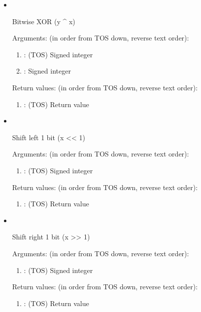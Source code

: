 \begin{itemize}
\noindent Return values: (in order from TOS down, reverse text order):
\begin{enumerate}
\item {}: (TOS) Return value
\end{enumerate}

\item \forthinlinehl{^}\ 

\noindent Bitwise XOR (y {\textasciicircum} x)

\noindent Arguments: (in order from TOS down, reverse text order):
\begin{enumerate}
\item {}: (TOS) Signed integer
\item {}: Signed integer
\end{enumerate}

\noindent Return values: (in order from TOS down, reverse text order):
\begin{enumerate}
\item {}: (TOS) Return value
\end{enumerate}

\item {}\ 

\noindent Shift left 1 bit (x << 1)

\noindent Arguments: (in order from TOS down, reverse text order):
\begin{enumerate}
\item {}: (TOS) Signed integer
\end{enumerate}

\noindent Return values: (in order from TOS down, reverse text order):
\begin{enumerate}
\item {}: (TOS) Return value
\end{enumerate}

\item {}\ 

\noindent Shift right 1 bit (x >> 1)

\noindent Arguments: (in order from TOS down, reverse text order):
\begin{enumerate}
\item {}: (TOS) Signed integer
\end{enumerate}

\noindent Return values: (in order from TOS down, reverse text order):
\begin{enumerate}
\item {}: (TOS) Return value
\end{enumerate}


\end{itemize}
